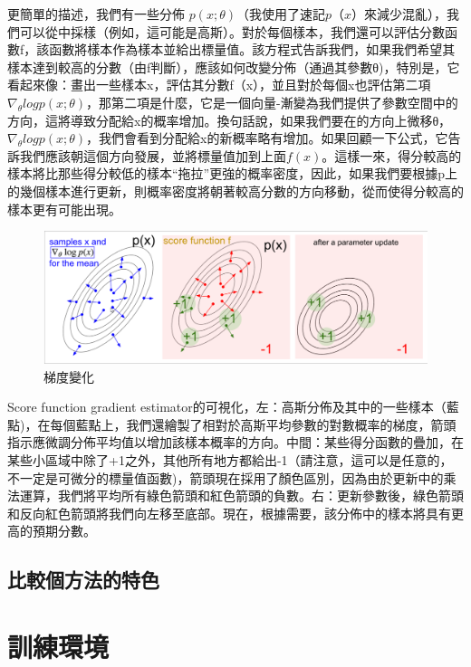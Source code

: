 \documentclass[14pt,a4paper]{report}  %
\begin{document}
更簡單的描述，我們有一些分佈 $p(x;\theta)$（我使用了速記$ p（x）$來減少混亂），我們可以從中採樣（例如，這可能是高斯）。對於每個樣本，我們還可以評估分數函數f，該函數將樣本作為樣本並給出標量值。該方程式告訴我們，如果我們希望其樣本達到較高的分數（由f判斷），應該如何改變分佈（通過其參數θ)，特別是，它看起來像：畫出一些樣本x，評估其分數f（x），並且對於每個x也評估第二項 $\nabla_\theta logp(x;θ)$，那第二項是什麼，它是一個向量-漸變為我們提供了參數空間中的方向，這將導致分配給x的概率增加。換句話說，如果我們要在的方向上微移θ，$\nabla_\theta logp(x;θ)$，我們會看到分配給x的新概率略有增加。如果回顧一下公式，它告訴我們應該朝這個方向發展，並將標量值加到上面$f(x)$。這樣一來，得分較高的樣本將比那些得分較低的樣本“拖拉”更強的概率密度，因此，如果我們要根據p上的幾個樣本進行更新，則概率密度將朝著較高分數的方向移動，從而使得分較高的樣本更有可能出現。\\
\begin{figure}[hbt!]
\begin{center}
\includegraphics[scale=0.4]{figure}
\caption{梯度變化}
\end{center}
\end{figure}

 Score function gradient estimator的可視化，左：高斯分佈及其中的一些樣本（藍點)，在每個藍點上，我們還繪製了相對於高斯平均參數的對數概率的梯度，箭頭指示應微調分佈平均值以增加該樣本概率的方向。中間：某些得分函數的疊加，在某些小區域中除了+1之外，其他所有地方都給出-1（請注意，這可以是任意的，不一定是可微分的標量值函數)，箭頭現在採用了顏色區別，因為由於更新中的乘法運算，我們將平均所有綠色箭頭和紅色箭頭的負數。右：更新參數後，綠色箭頭和反向紅色箭頭將我們向左移至底部。現在，根據需要，該分佈中的樣本將具有更高的預期分數。\\
\newpage
\section{比較個方法的特色}
\chapter{訓練環境}
\end{document}
